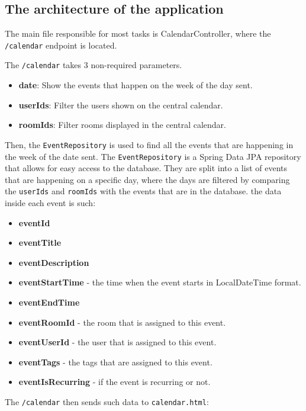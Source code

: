 \newpage%

\subsection{The architecture of the application}\label{subsec:the-architecture-of-the-application}

The main file responsible for most tasks is CalendarController, where the \texttt{/calendar} endpoint is located.

The \texttt{/calendar} takes 3 non-required parameters.
\begin{itemize}
    \item \textbf{date}: Show the events that happen on the week of the day sent.
    \item \textbf{userIds}: Filter the users shown on the central calendar.
    \item \textbf{roomIds}: Filter rooms displayed in the central calendar.
\end{itemize}
Then, the \texttt{EventRepository} is used to find all the events that are happening in the week of the date sent.
The \texttt{EventRepository} is a Spring Data JPA repository that allows for easy access to the database.
They are split into a list of events that are happening on a specific day, where the days are filtered by comparing the \texttt{userIds} and \texttt{roomIds} with the events that are in the database.
the data inside each event is such:
\begin{itemize}
    \item \textbf{eventId}
    \item \textbf{eventTitle}
    \item \textbf{eventDescription}
    \item \textbf{eventStartTime} - the time when the event starts in LocalDateTime format.
    \item \textbf{eventEndTime}
    \item \textbf{eventRoomId} - the room that is assigned to this event.
    \item \textbf{eventUserId} - the user that is assigned to this event.
    \item \textbf{eventTags} - the tags that are assigned to this event.
    \item \textbf{eventIsRecurring} - if the event is recurring or not.
\end{itemize}
The \texttt{/calendar} then sends such data to \texttt{calendar.html}:
